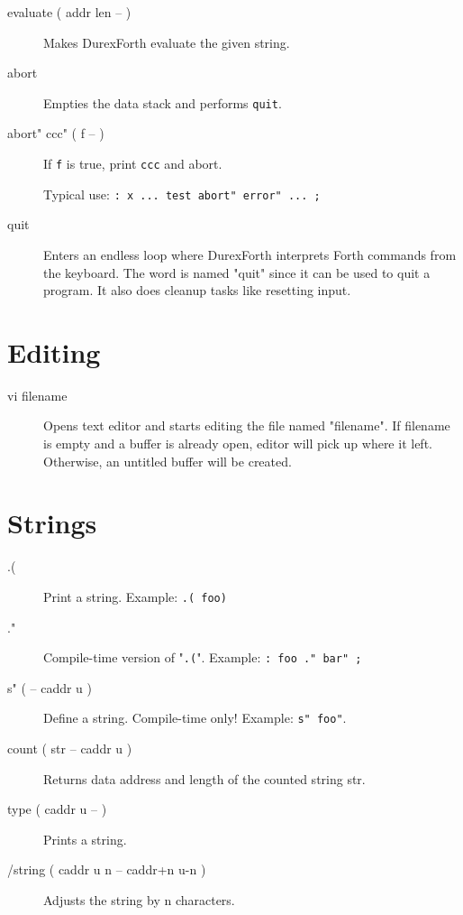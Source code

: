 \begin{description}
\item[evaluate ( addr len -- )] Makes DurexForth evaluate the given string.

\item[abort] Empties the data stack and performs \texttt{quit}.

\item[abort" ccc" ( f -- ) ] If \texttt{f} is true, print \texttt{ccc} and abort.

    Typical use: \texttt{: x ... test abort" error" ... ;}

\item[quit] Enters an endless loop where DurexForth interprets Forth commands from the keyboard. The word is named "quit" since it can be used to quit a program. It also does cleanup tasks like resetting input.

\end{description}

\section{Editing}

\begin{description}
\item[vi filename]

Opens text editor and starts editing the file named "filename".
If filename is empty and a buffer is already open, editor will pick up where it left.
Otherwise, an untitled buffer will be created.

\end{description}

\section{Strings}

\begin{description}
\item[.(]

Print a string. Example: \texttt{.( foo)}

\item[."]

Compile-time version of "\texttt{.(}". Example: \texttt{: foo ." bar" ;}

\item[s" ( -- caddr u )] Define a string. Compile-time only! Example: \texttt{s" foo"}.

\item[count ( str -- caddr u )] Returns data address and length of the counted string str.

\item[type ( caddr u -- )] Prints a string.

\item[/string ( caddr u n -- caddr+n u-n )] Adjusts the string by n characters. 

\end{description}

